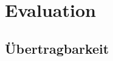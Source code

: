 \chapter{Evaluation}
\label{chapter6}
\label{6-AuswertungDatensatz}


\section{Übertragbarkeit}
\label{6-Übertragbarkeit}
